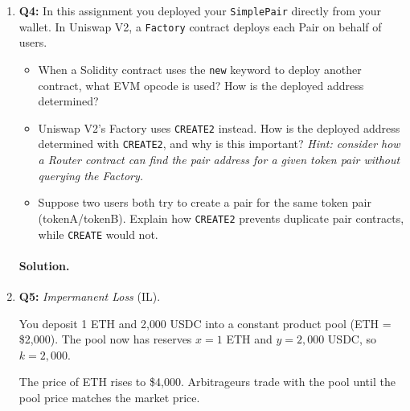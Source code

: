 \documentclass{article}
\begin{document}
\begin{enumerate}
    \paragraph{Solution.}

    \vspace{3em}

    \item \textbf{Q4:} In this assignment you deployed your \texttt{SimplePair} directly from your wallet. In Uniswap V2, a \texttt{Factory} contract deploys each Pair on behalf of users.

    \begin{itemize}
        \item[(a)] When a Solidity contract uses the \texttt{new} keyword to deploy another contract, what EVM opcode is used? How is the deployed address determined?
        \item[(b)] Uniswap V2's Factory uses \texttt{CREATE2} instead. How is the deployed address determined with \texttt{CREATE2}, and why is this important? \textit{Hint: consider how a Router contract can find the pair address for a given token pair without querying the Factory.}
        \item[(c)] Suppose two users both try to create a pair for the same token pair (tokenA/tokenB). Explain how \texttt{CREATE2} prevents duplicate pair contracts, while \texttt{CREATE} would not.
    \end{itemize}

    \paragraph{Solution.}

    \vspace{3em}

    \item \textbf{Q5:} \textit{Impermanent Loss} (IL).

    \noindent You deposit 1 ETH and 2{,}000 USDC into a constant product pool (ETH = \$2{,}000). The pool now has reserves $x = 1$ ETH and $y = 2{,}000$ USDC, so $k = 2{,}000$.

    \noindent The price of ETH rises to \$4{,}000. Arbitrageurs trade with the pool until the pool price matches the market price.


\end{enumerate}
\end{document}
